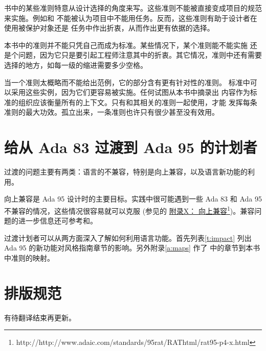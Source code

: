 书中的某些准则特意从设计选择的角度来写。这些准则不能被直接变成项目的规范
来实施。例如\cite{c:concurrency:pro-obj}和\cite{c:concurrency:task}
不能被认为项目中不能用任务。反而，这些准则有助于设计者在使用被保护对象还是
任务中作出折衷，从而作出更有依据的选择。

本书中的准则并不能只凭自己而成为标准。某些情况下，某个准则能不能实施
还是个问题，因为它只是要引起工程师注意其中的折衷。其它情况，准则中还有需要
选择的地方，如每一级的缩进需要多少空格。

当一个准则太概略而不能给出范例，它的部分含有更有针对性的准则。
标准中可以采用这些实例，因为它们更容易被实施。任何试图从本书中摘录出
内容作为标准的组织应该衡量所有的上下文。只有和其相关的准则一起使用，才能
发挥每条准则的最大功效。孤立出来，一条准则也许只有很少甚至没有效用。

\section{给从 Ada 83 过渡到 Ada 95 的计划者}
过渡的问题主要有两类：语言的不兼容，特别是向上兼容，以及语言新功能的利用。

向上兼容是 Ada 95 设计时的主要目标。实践中很可能遇到一些 Ada 83 和 Ada 95
不兼容的情况，这些情况很容易就可以克服 (参见\cite{rational95}的
\href{http://www.adaic.com/standards/95rat/RAThtml/rat95-p4-x.html}{附录X：
向上兼容}\footnote{http://http://www.adaic.com/standards/95rat/RAThtml/rat95-p4-x.html})。兼容问题的进一步信息还可参考\cite{taylor95}和\cite{interm95}。

过渡计划者可以从两方面深入了解如何利用语言功能。首先列表\ref{t:impact}
列出 Ada 95 的新功能对风格指南章节的影响。另外附录\ref{a:maps} 作了
\cite{arm95}中的章节到本书中准则的映射。

\section{排版规范}
有待翻译结束再更新。

\clearpage

